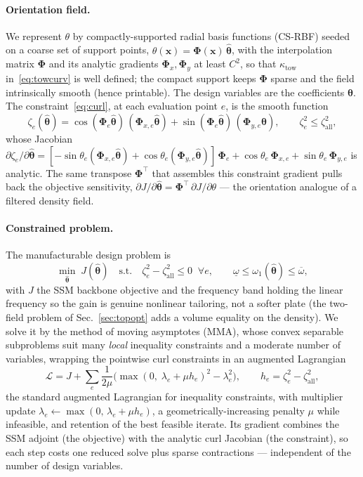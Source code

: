 \documentclass[11pt]{article}
\newcommand{\zall}{\zeta_{\mathrm{all}}}
\begin{document}
\paragraph{Orientation field.} We represent $\theta$ by compactly-supported radial basis
functions (CS-RBF) seeded on a coarse set of support points,
$\theta(\bm x)=\bm\Phi(\bm x)\,\hat{\bm\theta}$, with the interpolation matrix
$\bm\Phi$ and its analytic gradients $\bm\Phi_x,\bm\Phi_y$ at least $C^2$, so that
$\kappa_{\mathrm{tow}}$ in~\eqref{eq:towcurv} is well defined; the compact support keeps
$\bm\Phi$ sparse and the field intrinsically smooth (hence printable). The design
variables are the coefficients $\hat{\bm\theta}$. The constraint~\eqref{eq:curl}, at each
evaluation point $e$, is the smooth function
\begin{equation}
\zeta_e(\hat{\bm\theta})=\cos(\bm\Phi_e\hat{\bm\theta})\,(\bm\Phi_{x,e}\hat{\bm\theta})
+\sin(\bm\Phi_e\hat{\bm\theta})\,(\bm\Phi_{y,e}\hat{\bm\theta}),\qquad \zeta_e^2\le\zall^2,
\label{eq:curlfield}
\end{equation}
whose Jacobian $\partial\zeta_e/\partial\hat{\bm\theta}=
[-\sin\theta_e(\bm\Phi_{x,e}\hat{\bm\theta})+\cos\theta_e(\bm\Phi_{y,e}\hat{\bm\theta})]\,\bm\Phi_e
+\cos\theta_e\,\bm\Phi_{x,e}+\sin\theta_e\,\bm\Phi_{y,e}$ is analytic. The same transpose
$\bm\Phi^{\!\top}$ that assembles this constraint gradient pulls back the objective
sensitivity, $\partial J/\partial\hat{\bm\theta}=\bm\Phi^{\!\top}\,\partial J/\partial\theta$
--- the orientation analogue of a filtered density field.

\paragraph{Constrained problem.} The manufacturable design problem is
\begin{equation}
\min_{\hat{\bm\theta}}\;J(\hat{\bm\theta})\quad\text{s.t.}\quad
\zeta_e^2-\zall^2\le 0\;\;\forall e,\qquad
\underline{\omega}\le\omega_1(\hat{\bm\theta})\le\overline{\omega},
\label{eq:designprob}
\end{equation}
with $J$ the SSM backbone objective and the frequency band holding the linear frequency
so the gain is genuine nonlinear tailoring, not a softer plate (the two-field problem of
Sec.~\ref{sec:topopt} adds a volume equality on the density). We solve it by the method of
moving asymptotes (MMA), whose convex separable subproblems suit many \emph{local}
inequality constraints and a moderate number of variables, wrapping the pointwise
curl constraints in an augmented Lagrangian
\begin{equation}
\mathcal L=J+\sum_e\frac{1}{2\mu}\Big(\max(0,\;\lambda_e+\mu h_e)^2-\lambda_e^2\Big),
\qquad h_e=\zeta_e^2-\zall^2,
\label{eq:auglag}
\end{equation}
the standard augmented Lagrangian for inequality constraints, with multiplier update
$\lambda_e\!\leftarrow\!\max(0,\,\lambda_e+\mu h_e)$, a
geometrically-increasing penalty $\mu$ while infeasible, and retention of the best
feasible iterate. Its gradient combines the SSM adjoint (the objective) with the analytic
curl Jacobian (the constraint), so each step costs one reduced solve plus sparse
contractions --- independent of the number of design variables.
\end{document}
